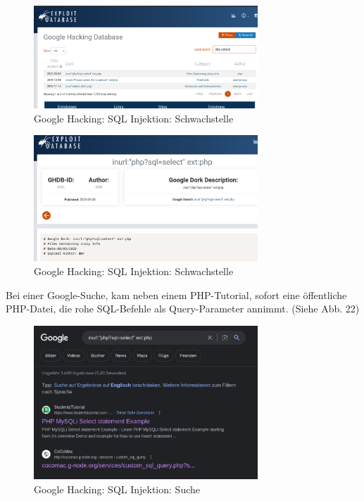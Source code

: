 \documentclass{article}
\begin{document}
\begin{figure}[H]
	\includegraphics[width=0.75\textwidth]{images/20}
	\centering
	\caption{Google Hacking: SQL Injektion: Schwachstelle}
\end{figure}

\begin{figure}[H]
	\includegraphics[width=0.75\textwidth]{images/21}
	\centering
	\caption{Google Hacking: SQL Injektion: Schwachstelle}
\end{figure}

Bei einer Google-Suche, kam neben einem PHP-Tutorial, sofort eine öffentliche PHP-Datei,
die rohe SQL-Befehle als Query-Parameter annimmt. (Siehe Abb. 22)

\begin{figure}[H]
	\includegraphics[width=0.75\textwidth]{images/22}
	\centering
	\caption{Google Hacking: SQL Injektion: Suche}
\end{figure}
\end{document}
